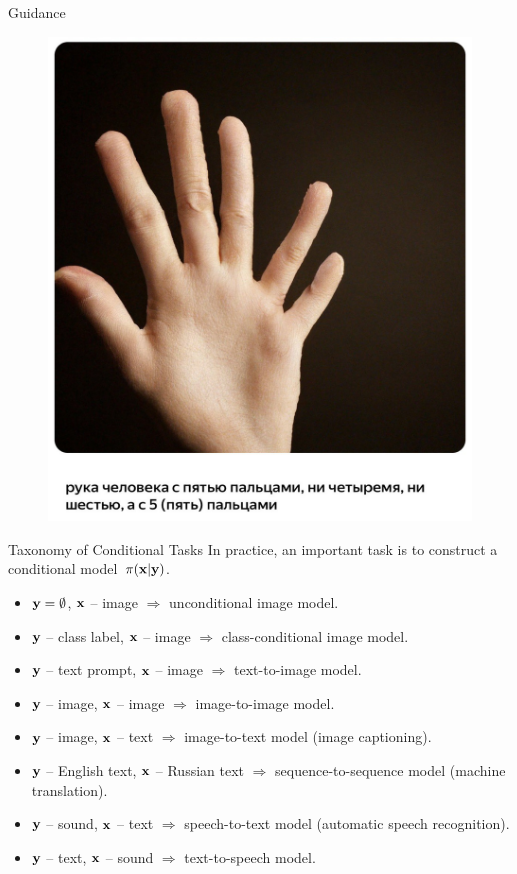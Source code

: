\documentclass{beamer}
\begin{document}
\begin{frame}{Guidance}
\begin{minipage}[t]{0.5\columnwidth}
\begin{figure}
			\includegraphics[width=0.9\linewidth]{figs/shedevrum2}
		\end{figure}
	\end{minipage}
\end{frame}
\begin{frame}{Taxonomy of Conditional Tasks}
	In practice, an important task is to construct a conditional model~$\pi(\mathbf{x} | \mathbf{y})$. 
		\begin{itemize}
			\item $\mathbf{y} = \emptyset$, $\mathbf{x}$ -- image $\Rightarrow$ unconditional image model.
			\item $\mathbf{y}$ -- class label, $\mathbf{x}$ -- image $\Rightarrow$ class-conditional image model.
			\item $\mathbf{y}$ -- text prompt, $\mathbf{x}$ -- image $\Rightarrow$ text-to-image model.
			\item $\mathbf{y}$ -- image, $\mathbf{x}$ -- image $\Rightarrow$ image-to-image model.
			\item $\mathbf{y}$ -- image, $\mathbf{x}$ -- text $\Rightarrow$ image-to-text model (image captioning).
			\item $\mathbf{y}$ -- English text, $\mathbf{x}$ -- Russian text $\Rightarrow$ sequence-to-sequence model (machine translation).
			\item $\mathbf{y}$ -- sound, $\mathbf{x}$ -- text $\Rightarrow$ speech-to-text model (automatic speech recognition).
			\item $\mathbf{y}$ -- text, $\mathbf{x}$ -- sound $\Rightarrow$ text-to-speech model.
		\end{itemize}
\end{frame}
\end{document}
